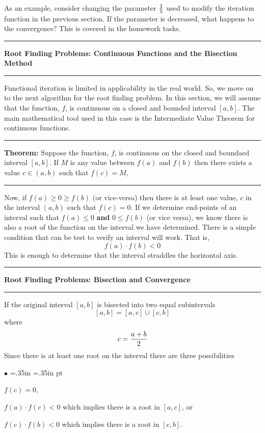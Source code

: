 \documentclass[10pt,fleqn]{article}
\begin{document}
As an example, consider changing the parameter ${1\over 5}$ used to modify the
iteration function in the previous section. If the parameter is decreased, what
happens to the convergence? This is covered in the homework tasks.
\vskip0.1in\hrule\vskip0.1in
\noindent
{\bf Root Finding Problems: Continuous Functions and the Bisection Method}
\vskip0.1in\hrule\vskip0.1in
\noindent
Functional iteration is limited in applicability in the real world. So, we move
on to the next algorithm for the root finding problem. In this section, we will
assume that the function, $f$, is continuous on a closed and bounded interval
$[a,b]$. The main mathematical tool used in this case is the Intermediate Value
Theorem for continuous functions.
\vskip0.1in\hrule\vskip0.1in
{\bf Theorem:} Suppose the function, $f$, is continuous on the closed and
boundaed interval $[a, b]$. If $M$ is any value between $f(a)$ and $f(b)$ then
there exists a value $c\in(a,b)$ such that $f(c)=M$,
\vskip0.1in\hrule\vskip0.1in
\noindent
Now, if $f(a)\geq 0\geq f(b)$ (or vice-versa) then there is at least one value,
$c$ in the interval $(a,b)$ such that $f(c)=0$. If we determine end-points of
an interval such that $f(a)\leq 0$ {\bf and} $0\leq f(b)$ (or vice versa), we
know there is also a root of the function on the interval we have determined.  
There is a simple condition that can be test to verify an interval will work.
That is,
$$
   f(a)\cdot f(b) < 0
$$
This is enough to determine that the interval straddles the horizontal axis.
\vskip0.1in\hrule\vskip0.1in
\noindent
{\bf Root Finding Problems: Bisection and Convergence}
\vskip0.1in\hrule\vskip0.1in
\noindent
If the original interval $[a, b]$ is bisected into two equal subintervals
$$
  [a, b] = [a, c] \cup [c, b]
$$
where
$$
  c = {{a+b}\over 2}
$$
Since there is at least one root on the interval there are three possibilities
\begin{list}{$\bullet$}{ \parsep=0pt \listparindent=0pt
\topsep=0pt \rightmargin=.35in \leftmargin=.35in  pt
\itemsep=2pt}
  \item $f(c) = 0$,
  \item $f(a)\cdot f(c)<0$ which implies there is a root in $[a,c]$, or
  \item $f(c)\cdot f(b)<0$ which implies there is a root in $[c,b]$.
\end{list}
\end{document}
